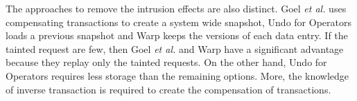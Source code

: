 The approaches to remove the intrusion effects are also distinct. Goel \textit{et al.} uses compensating transactions to create a system wide snapshot, Undo for Operators loads a previous snapshot and Warp keeps the versions of each data entry. If the tainted request are few, then Goel \textit{et al.} and Warp have a significant advantage because they replay only the tainted requests. On the other hand, Undo for Operators requires less storage than the remaining options. More, the knowledge of inverse transaction is required to create the compensation of transactions. \\